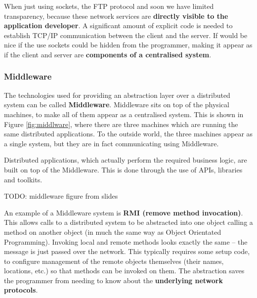 \documentclass{article}
\begin{document}
When just using sockets, the FTP protocol and soon we have limited transparency, because these network services are \textbf{directly visible to the application developer}. A significant amount of explicit code is needed to establish TCP/IP communication between the client and the server. If would be nice if the use sockets could be hidden from the programmer, making it appear as if the client and server are \textbf{components of a centralised system}.

\subsubsection{Middleware}

The technologies used for providing an abstraction layer over a distributed system can be called \textbf{Middleware}. Middleware sits on top of the physical machines, to make all of them appear as a centralised system. This is shown in Figure \ref{fig:middlware}, where there are three machines which are running the same distributed applications. To the outside world, the three machines appear as a single system, but they are in fact communicating using Middleware.

Distributed applications, which actually perform the required business logic, are built on top of the Middleware. This is done through the use of APIs, libraries and toolkits.

TODO: middleware figure from slides

An example of a Middleware system is \textbf{RMI (remove method invocation)}. This allows calls to a distributed system to be abstracted into one object calling a method on another object (in much the same way as Object Orientated Programming). Invoking local and remote methods looks exactly the same -- the message is just passed over the network. This typically requires some setup code, to configure management of the remote objects themselves (their names, locations, etc.) so that methods can be invoked on them. The abstraction saves the programmer from needing to know about the \textbf{underlying network protocols}.
\end{document}
